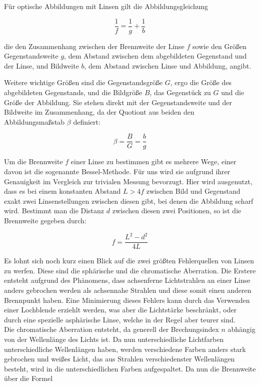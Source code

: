 \documentclass{article}
\begin{document}
Für optische Abbildungen mit Linsen gilt die Abbildungsgleichung

\begin{equation}
    \frac{1}{f} = \frac{1}{g} + \frac{1}{b}
\end{equation}

die den Zusammenhang zwischen der Brennweite der Linse $f$ sowie den Größen Gegenstandsweite $g$, dem Abstand zwischen dem abgebildeten Gegenstand und der Linse, und Bildweite $b$, dem Abstand zwischen Linse und Abbildung, angibt.

Weitere wichtige Größen sind die Gegenstandsgröße $G$, ergo die Größe des abgebildeten Gegenstands, und die Bildgröße $B$, das Gegenstück zu $G$ und die Größe der Abbildung. Sie stehen direkt mit der Gegenstandsweite und der Bildweite im Zusammenhang, da der Quotiont aus beiden den Abbildungsmaßstab $\beta$ definiert:

\begin{equation}
    \beta = \frac{B}{G} = \frac{b}{g}
\end{equation}

Um die Brennweite $f$ einer Linse zu bestimmen gibt es mehrere Wege, einer davon ist die sogenannte Bessel-Methode. Für uns wird sie aufgrund ihrer Genauigkeit im Vergleich zur trivialen Messung bevorzugt. Hier wird ausgenutzt, dass es bei einem konstanten Abstand $L > 4f$ zwischen Bild und Gegenstand exakt zwei Linsenstellungen zwischen diesen gibt, bei denen die Abbildung scharf wird. Bestimmt man die Distanz $d$ zwischen diesen zwei Positionen, so ist die Brennweite gegeben durch:

\begin{equation}
    f = \frac{L^2 - d^2}{4L}
\end{equation}

Es lohnt sich noch kurz einen Blick auf die zwei größten Fehlerquellen von Linsen zu werfen. Diese sind die sphärische und die chromatische Aberration. Die Erstere entsteht aufgrund des Phänomens, dass achsenferne Lichtstrahlen an einer Linse anders gebrochen werden als achsennahe Strahlen und diese somit einen anderen Brennpunkt haben. Eine Minimierung dieses Fehlers kann durch das Verwenden einer Lochblende erziehlt werden, was aber die Lichtstärke beschränkt, oder durch eine spezielle asphärische Linse, welche in der Regel aber teurer sind. \\ Die chromatische Aberration entsteht, da generell der Brechungsindex $n$ abhängig von der Wellenlänge des Lichts ist. Da nun unterschiedliche Lichtfarben unterschiedliche Wellenlängen haben, werden verschiedene Farben anders stark gebrochen und weißes Licht, das aus Strahlen verschiedenster Wellenlängen besteht, wird in die unterschiedlichen Farben aufgespaltet. Da nun die Brennweite über die Formel
\end{document}
